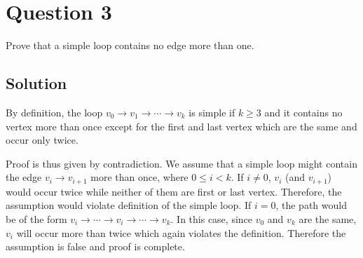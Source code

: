 
\section*{Question 3}

Prove that a simple loop contains no edge more than one.

\subsection*{Solution}

By definition, the loop $v_0 \rightarrow v_1 \rightarrow \cdots \rightarrow v_k$ is simple if $k \geq 3$ and it contains no vertex more than once except for the first and last vertex which are the same and occur only twice.

Proof is thus given by contradiction.
We assume that a simple loop might contain the edge $v_i \rightarrow v_{i+1}$ more than once, where $0 \leq i < k$.
If $i \neq 0$, $v_i$ (and $v_{i+1}$) would occur twice while neither of them are first or last vertex.
Therefore, the assumption would violate definition of the simple loop.
If $i = 0$, the path would be of the form $v_i \rightarrow \cdots \rightarrow v_i \rightarrow \cdots \rightarrow v_k$.
In this case, since $v_0$ and $v_k$ are the same, $v_i$ will occur more than twice which again violates the definition.
Therefore the assumption is false and proof is complete.
